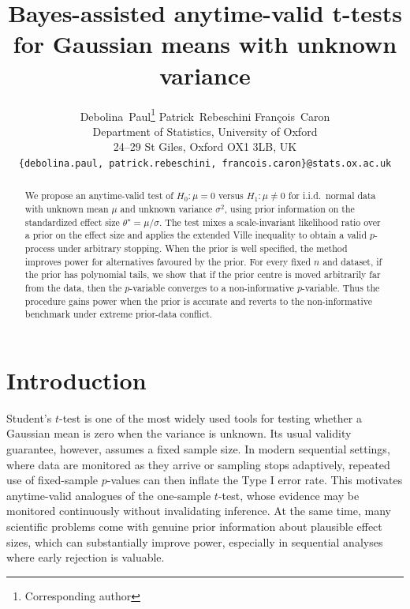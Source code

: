 \documentclass{article}
\title{Bayes-assisted anytime-valid t-tests for
Gaussian means with unknown variance}
\author{%
  Debolina~Paul\thanks{Corresponding author}
  \hspace{1.5cm}
  Patrick~Rebeschini
  \hspace{1.5cm}
  Fran\c{c}ois~Caron
  \\
  Department of Statistics, University of Oxford\\
  24--29 St Giles, Oxford OX1 3LB, UK\\
  \texttt{\{debolina.paul, patrick.rebeschini, francois.caron\}@stats.ox.ac.uk}
}
\begin{document}
\maketitle


\begin{abstract}
  We propose an anytime-valid test of $H_0:\mu=0$ versus $H_1:\mu\neq 0$ for i.i.d.\ normal data with unknown mean $\mu$ and unknown variance $\sigma^2$, using prior information on the standardized effect size $\theta^\star=\mu/\sigma$. The test mixes a scale-invariant likelihood ratio over a prior on the effect size and applies the extended Ville inequality to obtain a valid $p$-process under arbitrary stopping. When the prior is well specified, the method improves power for alternatives favoured by the prior. For every fixed $n$ and dataset, if the prior has polynomial tails, we show that if the prior centre is moved arbitrarily far from the data, then the $p$-variable converges to a non-informative $p$-variable. Thus the procedure gains power when the prior is accurate and reverts to the non-informative benchmark under extreme prior-data conflict.
\end{abstract}



\section{Introduction}\label{sec:intro}
Student's \(t\)-test is one of the most widely used tools for testing whether a Gaussian mean is zero when the variance is unknown. Its usual validity guarantee, however, assumes a fixed sample size. In modern sequential settings, where data are monitored as they arrive or sampling stops adaptively, repeated use of fixed-sample \(p\)-values can then inflate the
Type I error rate. This motivates anytime-valid analogues of the one-sample \(t\)-test, whose evidence may be monitored continuously without invalidating inference. At the same time, many scientific problems come with genuine prior information about plausible effect sizes, which can substantially improve power, especially in sequential analyses where early rejection is valuable.
\end{document}
